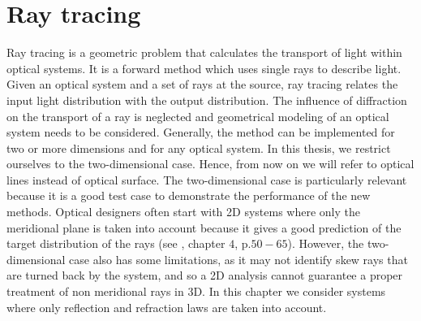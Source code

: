 \chapter{Ray tracing}\label{chap:raytracing}
Ray tracing is a geometric problem that calculates the transport of light within optical systems.
It is a forward method which uses single rays to describe  light.
Given an optical system and a set of rays at the source, ray tracing relates the input light distribution with the output distribution. 
The influence of diffraction on the transport of a ray is neglected and geometrical modeling of an optical system needs to be considered.
Generally, the method can be implemented for two or more dimensions and for any optical system.
In this thesis, we restrict ourselves to the two-dimensional case. Hence, from now on we will refer to optical lines instead of optical surface.
The two-dimensional case is particularly relevant because it is a good test case to demonstrate the performance of the new methods.
Optical designers often start with 2D systems where only the meridional plane is taken into account because it gives a good prediction of the target distribution of the rays
(see \cite{winston2005nonimaging}, chapter $4$, p.$50-65$). However, the two-dimensional case also has some limitations, as it may not identify skew rays that are turned back by the system, and so a 2D analysis cannot guarantee a proper treatment of non meridional rays in 3D. In this chapter we consider systems where only reflection and refraction laws are taken into account.
